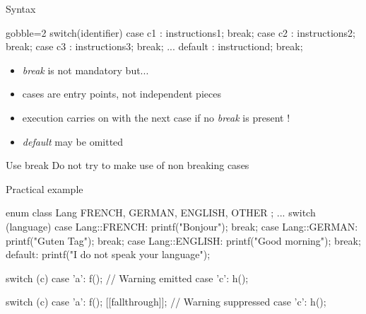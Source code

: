 \begin{frame}[fragile]
  \begin{block}{Syntax}
    \begin{cppcode*}{gobble=2}
      switch(identifier) {
        case c1 : instructions1; break;
        case c2 : instructions2; break;
        case c3 : instructions3; break;
        ...
        default : instructiond; break;
      }
    \end{cppcode*}
    \begin{itemize}
      \item {\it break} is not mandatory but...
      \item cases are entry points, not independent pieces
      \item execution carries on with the next case if no {\it break} is present !
      \item {\it default} may be omitted
    \end{itemize}
  \end{block}
  \pause
  \begin{alertblock}{Use break}
    Do not try to make use of non breaking cases
  \end{alertblock}
\end{frame}

\begin{frame}[fragile]
  \begin{exampleblock}{Practical example}
    \begin{cppcode*}{}
      enum class Lang { FRENCH, GERMAN, ENGLISH, OTHER };
      ...
      switch (language) {
      case Lang::FRENCH:
        printf("Bonjour");
        break;
       case Lang::GERMAN:
        printf("Guten Tag");
        break;
      case Lang::ENGLISH:
        printf("Good morning");
        break;
      default:
        printf("I do not speak your language");
      }
    \end{cppcode*}
  \end{exampleblock}
\end{frame}


\begin{frame}[fragile]
  \begin{alertblock}{}
    \begin{cppcode}
      switch (c) {
        case 'a':
          f(); // Warning emitted
        case 'c':
          h();
      }
    \end{cppcode}
  \end{alertblock}
  \begin{exampleblock}{}
    \begin{cppcode*}{}
      switch (c) {
        case 'a':
          f();
          [[fallthrough]]; // Warning suppressed
        case 'c':
          h();
      }
    \end{cppcode*}
  \end{exampleblock}
\end{frame}

